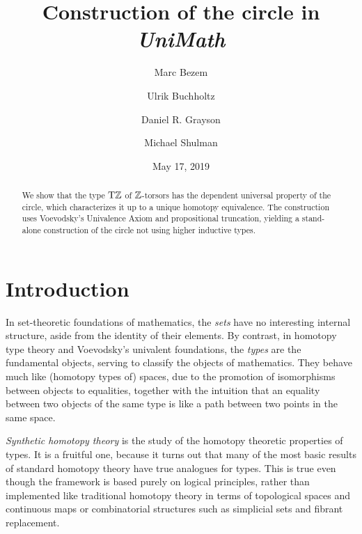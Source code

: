 \documentclass[a4paper,12pt]{amsart}
\begin{document}
\newcommand{\UniMath}{\emph{UniMath}}
\title{Construction of the circle in \UniMath}
{
    \author{Marc Bezem}
    \address{Department of Informatics, University of Bergen}
}
{
    \author{Ulrik Buchholtz}
    \address{Department of Mathematics, Technische Universit\"at Darmstadt}
}
{
    \author{Daniel R. Grayson}
}
{
    \author{Michael Shulman}
    \address{Department of Mathematics, University of San Diego}
}

\date{May 17, 2019}

\begin{abstract}
We show that the type ${\mathrm{T}\mathbb{Z}}$ of $\mathbb{Z}$-torsors has the dependent universal property of the circle,
which characterizes it up to a unique homotopy equivalence.
The construction uses Voevodsky's Univalence Axiom and propositional truncation,
yielding a stand-alone construction of the
circle not using higher inductive types.
\end{abstract}

\maketitle
{}
\tableofcontents

\section{Introduction}

In set-theoretic foundations of mathematics, the {\em sets} have no interesting internal structure, aside from the identity of their elements.
By contrast, in homotopy type theory and Voevodsky's univalent foundations, the {\em types} are the fundamental objects, serving to classify the
objects of mathematics.  They behave much like (homotopy types of) spaces, due to the promotion of isomorphisms between objects to
equalities, together with the intuition that an equality between two objects of the same type is like a path between two points in the same
space.

{\em Synthetic homotopy theory} is the study of the homotopy theoretic properties of types.  It is a fruitful one, because it turns out that many
of the most basic results of standard homotopy theory have true analogues for types.  This is true even though the framework is based purely on
logical principles, rather than implemented like traditional homotopy theory in terms of topological spaces and continuous maps or combinatorial
structures such as simplicial sets and fibrant replacement.
\end{document}
